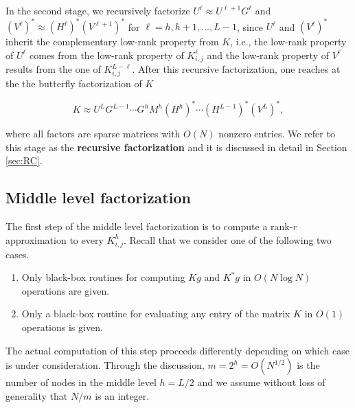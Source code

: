 In the second stage, we recursively factorize $U^\ell \approx
U^{\ell+1}G^{\ell}$ and $(V^\ell)^* \approx (H^{\ell})^*
(V^{\ell+1})^*$ for $\ell=h,h+1,\dots,L-1$, since $U^\ell$ and
$(V^{\ell})^*$ inherit the complementary low-rank property from $K$, i.e., the low-rank property of $U^\ell$ comes from the low-rank property of $K^\ell_{i,j}$ and the low-rank property of $V^\ell$
results from the one of $K^{L-\ell}_{i,j}$. After this recursive factorization, one reaches at the the butterfly factorization of $K$

\begin{equation}
  K \approx U^{L}G^{L-1}\cdots G^{h} M^h (H^{h})^* \cdots (H^{L-1})^*
  (V^L)^*,
\end{equation}

where all factors are sparse matrices with $O(N)$ nonzero entries. We refer to this stage as the {\bf recursive factorization} and it is discussed in detail in Section \ref{sec:RC}.

\subsection{Middle level factorization}
\label{sec:MiddleConstruction}

The first step of the middle level factorization is to compute a rank-$r$ approximation to every $K^h_{i,j}$. Recall that we consider one of the following two cases.

\begin{enumerate}
\item Only black-box routines for computing $Kg$ and $K^*g$ in
  $O(N\log N)$ operations are given.
\item Only a black-box routine for evaluating any entry of the matrix $K$ in $O(1)$ operations is given.
\end{enumerate}

The actual computation of this step proceeds differently depending on which case is under consideration. Through the discussion, $m=2^h = O(N^{1/2})$ is the number of nodes in the middle level $h=L/2$ and we assume without loss of generality that $N/m$ is an integer.

